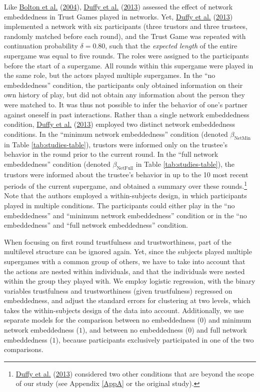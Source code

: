 \documentclass[
  11pt,
]{article}
\begin{document}
Like \protect\hyperlink{ref-bolton_electronic_2004}{Bolton et al.} (\protect\hyperlink{ref-bolton_electronic_2004}{2004}), \protect\hyperlink{ref-duffy2013social}{Duffy et al.} (\protect\hyperlink{ref-duffy2013social}{2013}) assessed the effect of network embeddedness in Trust Games played in networks.
Yet, \protect\hyperlink{ref-duffy2013social}{Duffy et al.} (\protect\hyperlink{ref-duffy2013social}{2013}) implemented a network with six participants (three trustors and three trustees, randomly matched before each round), and the Trust Game was repeated with continuation probability \(\delta = 0.80\), such that the \emph{expected length} of the entire supergame was equal to five rounds.
The roles were assigned to the participants before the start of a supergame.
All rounds within this supergame were played in the same role, but the actors played multiple supergames.
In the ``no embeddedness'' condition, the participants only obtained information on their own history of play, but did not obtain any information about the person they were matched to.
It was thus not possible to infer the behavior of one's partner against oneself in past interactions.
Rather than a single network embeddedness condition, \protect\hyperlink{ref-duffy2013social}{Duffy et al.} (\protect\hyperlink{ref-duffy2013social}{2013}) employed two distinct network embeddedness conditions.
In the ``minimum network embeddedness'' condition (denoted \(\beta_{\text{NetMin}}\) in Table \ref{tab:studies-table}), trustors were informed only on the trustee's behavior in the round prior to the current round.
In the ``full network embeddedness'' condition (denoted \(\beta_{\text{NetFull}}\) in Table \ref{tab:studies-table}), the trustors were informed about the trustee's behavior in up to the 10 most recent periods of the current supergame, and obtained a summary over these rounds.\footnote{\protect\hyperlink{ref-duffy2013social}{Duffy et al.} (\protect\hyperlink{ref-duffy2013social}{2013}) considered two other conditions that are beyond the scope of our study (see Appendix \ref{AppA} or the original study).}
Note that the authors employed a within-subjects design, in which participants played in multiple conditions.
The participants could either play in the ``no embeddedness'' and ``minimum network embeddedness'' condition or in the ``no embeddedness'' and ``full network embeddedness'' condition.

When focusing on first round trustfulness and trustworthiness, part of the multilevel structure can be ignored again.
Yet, since the subjects played multiple supergames with a common group of others, we have to take into account that the actions are nested within individuals, and that the individuals were nested within the group they played with.
We employ logistic regression, with the binary variables trustfulness and trustworthiness (given trustfulness) regressed on embeddedness, and adjust the standard errors for clustering at two levels, which takes the within-subjects design of the data into account.
Additionally, we use separate models for the comparison between no embeddedness (\(0\)) and minimum network embeddedness (\(1\)), and between no embeddedness (\(0\)) and full network embeddedness (\(1\)), because participants exclusively participated in one of the two comparisons.
\end{document}
